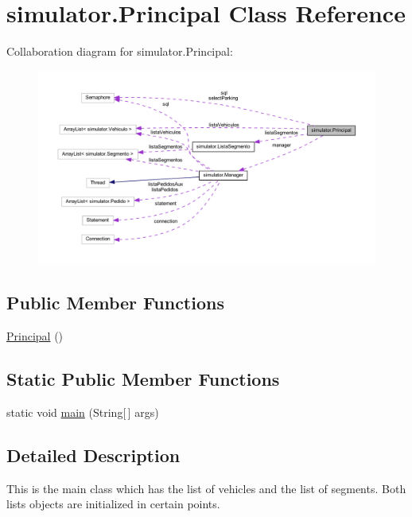 \hypertarget{classsimulator_1_1_principal}{}\section{simulator.\+Principal Class Reference}
\label{classsimulator_1_1_principal}


Collaboration diagram for simulator.\+Principal\+:\nopagebreak
\begin{figure}[H]
\begin{center}
\leavevmode
\includegraphics[width=350pt]{classsimulator_1_1_principal__coll__graph}
\end{center}
\end{figure}
\subsection*{Public Member Functions}
\begin{DoxyCompactItemize}
\item 
\mbox{\hyperlink{classsimulator_1_1_principal_afbfaa88badb04d25df7d7c0e36067ef8}{Principal}} ()
\end{DoxyCompactItemize}
\subsection*{Static Public Member Functions}
\begin{DoxyCompactItemize}
\item 
static void \mbox{\hyperlink{classsimulator_1_1_principal_a472c3314a2ab8e7eff9c2539b7818a22}{main}} (String\mbox{[}$\,$\mbox{]} args)
\end{DoxyCompactItemize}


\subsection{Detailed Description}
This is the main class which has the list of vehicles and the list of segments. Both lists objects are initialized in certain points.

